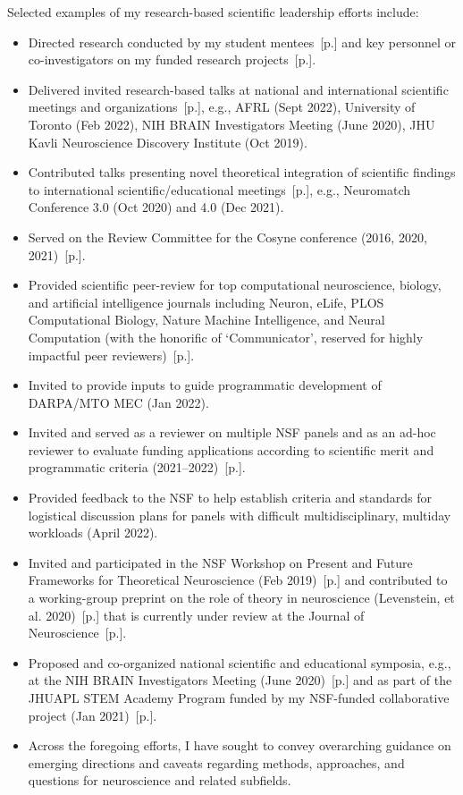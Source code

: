 \documentclass[10pt]{article}
\newcommand{\see}[1]{[\textcolor{hopkinsblue}{p.\pageref{sec:#1}}]}
\begin{document}
Selected examples of my research-based scientific leadership efforts include:
%
\begin{itemize}
  \item Directed research conducted by my student mentees~\see{mentoring}
    and key personnel or co-investigators on my funded research
    projects~\see{resprogram}.
  \item Delivered invited research-based talks at national and international
    scientific meetings and organizations~\see{natltalks}, e.g., AFRL (Sept 2022),
    University of Toronto (Feb 2022), NIH BRAIN Investigators Meeting (June 2020),
    JHU Kavli Neuroscience Discovery Institute (Oct 2019).
  \item Contributed talks presenting novel theoretical integration of scientific
    findings to international scientific/educational meetings~\see{intltalks}, e.g.,
    Neuromatch Conference 3.0 (Oct 2020) and 4.0 (Dec 2021).
  \item Served on the Review Committee for the Cosyne conference (2016, 2020,
    2021)~\see{confsvc}.
  \item Provided scientific peer-review for top computational neuroscience,
    biology, and artificial intelligence journals including Neuron, eLife, PLOS
    Computational Biology, Nature Machine Intelligence, and Neural Computation
    (with the honorific of `Communicator', reserved for highly impactful peer
    reviewers)~\see{service}.
  \item Invited to provide inputs to guide programmatic development of DARPA/MTO
    MEC (Jan 2022).
  \item Invited and served as a reviewer on multiple NSF panels and as an ad-hoc
    reviewer to evaluate funding applications according to scientific merit and
    programmatic criteria (2021--2022)~\see{programsvc}.
  \item Provided feedback to the NSF to help establish criteria and standards
    for logistical discussion plans for panels with difficult multidisciplinary,
    multiday workloads (April 2022).
  \item Invited and participated in the NSF Workshop on Present and Future
    Frameworks for Theoretical Neuroscience (Feb 2019)~\see{natltalks} and
    contributed to a working-group preprint on the role of theory in neuroscience
    (Levenstein, et al. 2020)~\see{preprints} that is currently under review at
    the Journal of Neuroscience~\see{pubs}.
  \item Proposed and co-organized national scientific and educational symposia,
    e.g., at the NIH BRAIN Investigators Meeting (June 2020)~\see{natltalks}
    and as part of the JHUAPL STEM Academy Program funded by my NSF-funded
    collaborative project (Jan 2021)~\see{eduprogram}.
  \item Across the foregoing efforts, I have sought to convey overarching
    guidance on emerging directions and caveats regarding methods, approaches, and
    questions for neuroscience and related subfields.
\end{itemize}
\end{document}
